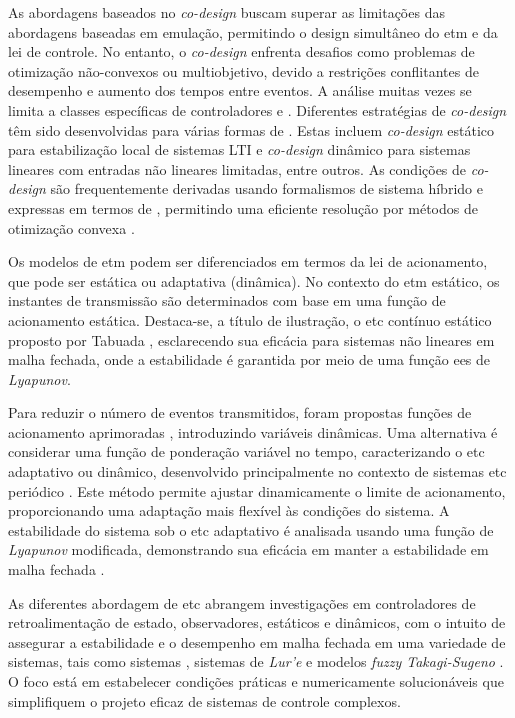 As abordagens baseados no \textit{co-design} buscam superar as limitações das abordagens baseadas em emulação, permitindo o design simultâneo do \acrshort{etm} e da lei de controle. No entanto, o \textit{co-design} enfrenta desafios como problemas de otimização não-convexos ou multiobjetivo, devido a restrições conflitantes de desempenho e aumento dos tempos entre eventos. A análise muitas vezes se limita a classes específicas de controladores e  \cite{coutinho2021}. Diferentes estratégias de \textit{co-design} têm sido desenvolvidas para várias formas de . Estas incluem \textit{co-design} estático para estabilização local de sistemas LTI e \textit{co-design} dinâmico para sistemas lineares com entradas não lineares limitadas, entre outros. As condições de \textit{co-design} são frequentemente derivadas usando formalismos de sistema híbrido e expressas em termos de , permitindo uma eficiente resolução por métodos de otimização convexa \cite{coutinho2021}.


Os modelos de \acrshort{etm} podem ser diferenciados em termos da lei de acionamento, que pode ser estática ou adaptativa (dinâmica). No contexto do \acrshort{etm} estático, os instantes de transmissão são determinados com base em uma função de acionamento estática. Destaca-se, a título de ilustração, o \acrshort{etc} contínuo estático proposto por Tabuada \cite{Tabuada2007}, esclarecendo sua eficácia para sistemas não lineares em malha fechada, onde a estabilidade é garantida por meio de uma função \acrfull{ees} de \textit{Lyapunov}.

Para reduzir o número de eventos transmitidos, foram propostas funções de acionamento aprimoradas \cite{Wang2020,Zong2023,Ge2017, Ning2018, Wu2021}, introduzindo variáveis dinâmicas. Uma alternativa é considerar uma função de ponderação variável no tempo, caracterizando o \acrshort{etc} adaptativo ou dinâmico, desenvolvido principalmente no contexto de sistemas \acrshort{etc} periódico \cite{coutinho2021}. Este método permite ajustar dinamicamente o limite de acionamento, proporcionando uma adaptação mais flexível às condições do sistema. A estabilidade do sistema sob o \acrshort{etc} adaptativo é analisada usando uma função de \textit{Lyapunov} modificada, demonstrando sua eficácia em manter a estabilidade em malha fechada \cite{coutinho2021}.

As diferentes abordagem de \acrshort{etc} abrangem investigações em controladores de retroalimentação de estado, observadores,  estáticos e dinâmicos, com o intuito de assegurar a estabilidade e o desempenho em malha fechada em uma variedade de sistemas, tais como sistemas  \cite{Zong2023,Wu2021}, sistemas de \textit{Lur'e} \cite{Zhang2017} e modelos \textit{fuzzy Takagi-Sugeno} \cite{Pan2017}. O foco está em estabelecer condições práticas e numericamente solucionáveis que simplifiquem o projeto eficaz de sistemas de controle complexos.

